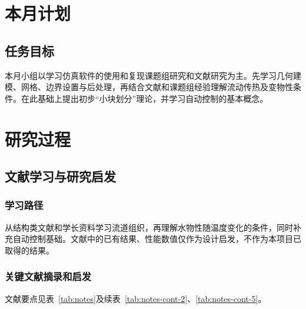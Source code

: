 \documentclass[stage1,fontset=fandol]{ydzjreport}
\begin{document}
\makestageonehead

\section{本月计划}

\subsection{任务目标}

本月小组以学习仿真软件的使用和复现课题组研究和文献研究为主。先学习几何建模、网格、边界设置与后处理，再结合文献和课题组经验理解流动传热及变物性条件。在此基础上提出初步“小块划分”理论，并学习自动控制的基本概念。

\section{研究过程}

\subsection{文献学习与研究启发}

\subsubsection{学习路径}

从结构类文献和学长资料学习流道组织，再理解水物性随温度变化的条件，同时补充自动控制基础。文献中的已有结果、性能数值仅作为设计启发，不作为本项目已取得的结果。

\subsubsection{关键文献摘录和启发}
文献要点见表~\ref{tab:notes}及续表~\ref{tab:notes-cont-2}、\ref{tab:notes-cont-5}。
\end{document}
